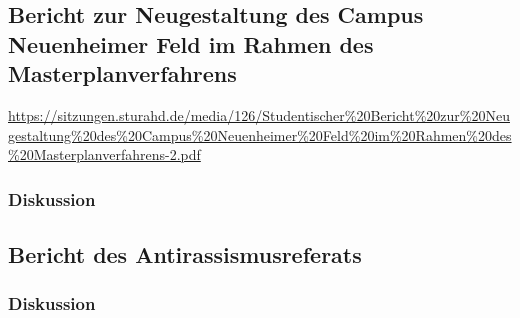 \subsection{Bericht zur Neugestaltung des Campus Neuenheimer Feld im Rahmen des Masterplanverfahrens}
\url{https://sitzungen.sturahd.de/media/126/Studentischer%20Bericht%20zur%20Neugestaltung%20des%20Campus%20Neuenheimer%20Feld%20im%20Rahmen%20des%20Masterplanverfahrens-2.pdf}
\subsubsection{Diskussion}
\ul{
}

\subsection{Bericht des Antirassismusreferats}
\subsubsection{Diskussion}
\ul{
}
